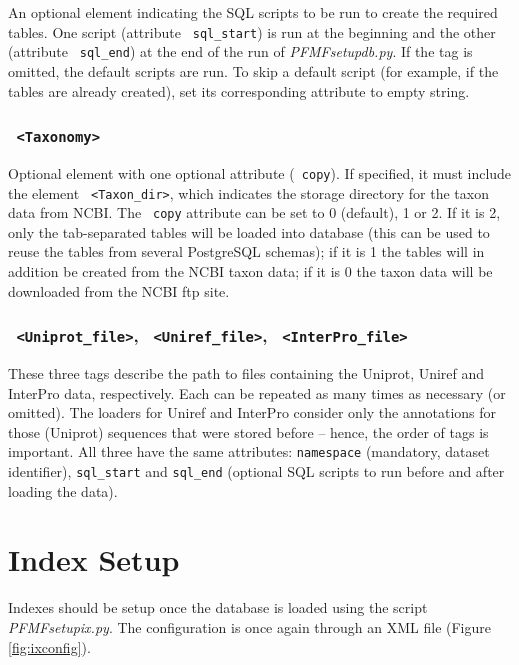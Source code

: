 \documentclass[10pt,letter]{article}
\begin{document}
An optional element indicating the SQL scripts to be run to create the required tables. One script (attribute \texttt{ sql\_start}) is run at the beginning and the other (attribute \texttt{ sql\_end}) at the end of the run of {\it PFMFsetupdb.py}. If the tag is omitted, the default scripts are run. To skip a default script (for example, if the tables are already created), set its corresponding attribute to empty string.

\subsubsection*{\texttt{ <Taxonomy>}}

Optional element with one optional attribute (\texttt{ copy}). If specified, it must include the element \texttt{ <Taxon\_dir>}, which indicates the storage directory for the taxon data from NCBI. The \texttt{ copy} attribute can be set to 0 (default), 1 or 2. If it is 2, only the tab-separated tables will be loaded into database (this can be used to reuse the tables from several PostgreSQL schemas); if it is 1 the tables will in addition be created from the NCBI taxon data; if it is 0 the taxon data will be downloaded from the NCBI ftp site.

\subsubsection*{\texttt{ <Uniprot\_file>}, \texttt{ <Uniref\_file>}, \texttt{ <InterPro\_file>}}

These three tags describe the path to files containing the Uniprot, Uniref and InterPro data, respectively. Each can be repeated as many times as necessary (or omitted). The loaders for Uniref and InterPro consider only the annotations for those (Uniprot) sequences that were stored before -- hence, the order of tags is important. All three have the same attributes: \texttt{namespace} (mandatory, dataset identifier), \texttt{sql\_start} and \texttt{sql\_end} (optional SQL scripts to run before and after loading the data).

\section{Index Setup}

Indexes should be setup once the database is loaded using the script {\it PFMFsetupix.py}. The configuration is once again through an XML file (Figure \ref{fig:ixconfig}).
\end{document}
